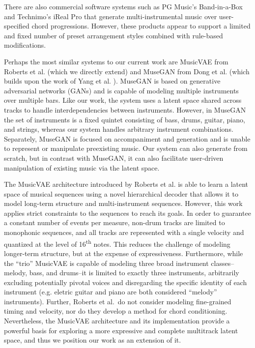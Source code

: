 \documentclass{article}
\begin{document}
There are also commercial software systems such as PG Music's Band-in-a-Box \cite{gannon1990band} and Technimo's iReal Pro \cite{irealpro2008} that generate multi-instrumental music over user-specified chord progressions.  However, these products appear to support a limited and fixed number of preset arrangement styles combined with rule-based modifications.

Perhaps the most similar systems to our current work are MusicVAE from Roberts et al. \cite{roberts2018hierarchical} (which we directly extend) and MuseGAN from Dong et al. \cite{dong18aaai} (which builds upon the work of Yang et al. \cite{yang2017midinet}).  MuseGAN \cite{dong18aaai} is based on generative adversarial networks (GANs) and is capable of modeling multiple instruments over multiple bars.  Like our work, the system uses a latent space shared across tracks to handle interdependencies between instruments. However, in MuseGAN the set of instruments is a fixed quintet consisting of bass, drums, guitar, piano, and strings, whereas our system handles arbitrary instrument combinations.  Separately, MuseGAN is focused on accompaniment and generation and is unable to represent or manipulate preexisting music.  Our system can also generate from scratch, but in contrast with MuseGAN, it can also facilitate user-driven manipulation of existing music via the latent space.

The MusicVAE architecture introduced by Roberts et al. \cite{roberts2018hierarchical} is able to learn a latent space of musical sequences using a novel hierarchical decoder that allows it to model long-term structure and multi-instrument sequences.  However, this work applies strict constraints to the sequences to reach its goals.  In order to guarantee a constant number of events per measure, non-drum tracks are limited to monophonic sequences, and all tracks are represented with a single velocity and quantized at the level of 16\textsuperscript{th} notes.  This reduces the challenge of modeling longer-term structure, but at the expense of expressiveness.  Furthermore, while the ``trio'' MusicVAE is capable of modeling three broad instrument classes--melody, bass, and drums--it is limited to exactly three instruments, arbitrarily excluding potentially pivotal voices and disregarding the specific identity of each instrument (e.g. eletric guitar and piano are both considered ``melody'' instruments).  Further, Roberts et al.\ do not consider modeling fine-grained timing and velocity, nor do they develop a method for chord conditioning. Nevertheless, the MusicVAE architecture and its implementation provide a powerful basis for exploring a more expressive and complete multitrack latent space, and thus we position our work as an extension of it.
\end{document}
